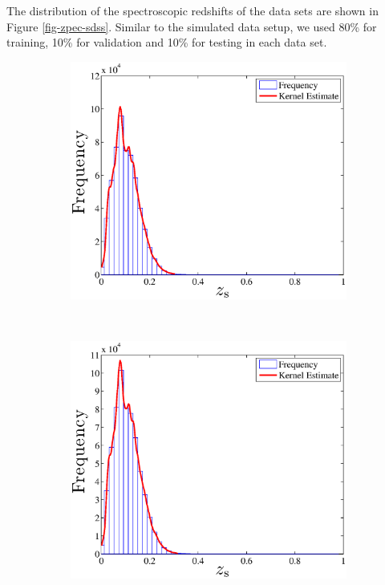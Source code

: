 \documentclass[useAMS,usenatbib,fleqn]{mn2e}
\begin{document}
The distribution of the spectroscopic redshifts of the data sets are shown in Figure \ref{fig-zpec-sdss}. Similar to the simulated data setup, we used 80\% for training, 10\% for validation and 10\% for testing in each data set.

\begin{figure}
        \centering
        \begin{subfigure}[b]{0.45\textwidth}
                \includegraphics[width=\textwidth]{figures/zspec_sdss_cut}
        \end{subfigure}
        ~
        \begin{subfigure}[b]{0.45\textwidth}
                \includegraphics[width=\textwidth]{figures/zspec_boss_cut}
        \end{subfigure}


\end{figure}
\end{document}

